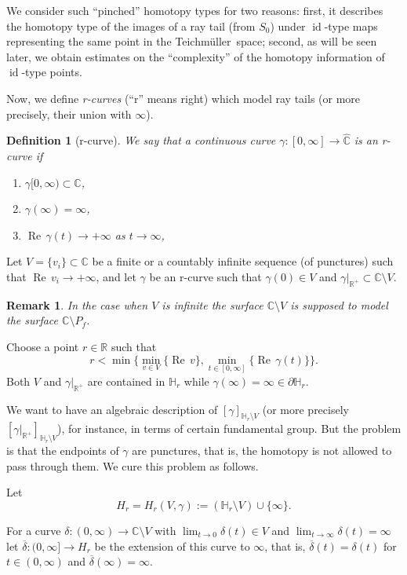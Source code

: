 \documentclass[10pt,reqno,a4paper]{amsart}
\numberwithin{figure}{section}
\numberwithin{equation}{section}
\newtheorem{defn}[thm]{Definition}
\newtheorem{remark}[thm]{Remark}
\newcommand{\tei}{Teichm\"uller}
\newcommand{\id}{\operatorname{id}}
\renewcommand{\Re}{\operatorname{Re\,}}
\begin{document}
We consider such ``pinched'' homotopy types for two reasons: first, it describes the homotopy type of the images of a ray tail (from $S_0$) under $\id$-type maps representing the same point in the \tei\ space; second, as will be seen later, we obtain estimates on the ``complexity'' of the homotopy information of $\id$-type points.

Now, we define \emph{r-curves} (``r'' means right) which model ray tails (or more precisely, their union with $\infty$).

\begin{defn}[r-curve]	
	We say that a continuous curve $\gamma:[0,\infty]\to\hat{\mathbb{C}}$ is an \emph{r-curve} if
	\begin{enumerate}
		\item $\gamma[0,\infty)\subset\mathbb{C}$,
		\item $\gamma(\infty)=\infty$,
		\item $\Re \gamma(t)\to+\infty$ as $t\to\infty$,
	\end{enumerate}
\end{defn}

Let $V=\{v_i\}\subset\mathbb{C}$ be a finite or a countably infinite sequence (of punctures) such that $\Re v_i\to +\infty$,  and  let $\gamma$ be an r-curve such that $\gamma(0)\in V$ and $\gamma|_{\mathbb{R}^+}\subset\mathbb{C}\setminus V$.

\begin{remark}
	In the case when $V$ is infinite the surface $\mathbb{C}\setminus V$ is supposed to model the surface $\mathbb{C}\setminus P_f$.
\end{remark}

Choose a point $r\in\mathbb{R}$ such that 
$$r < \min \{\min\limits_{v\in V}\{\Re v\},\min\limits_{t\in [0,\infty]}\{\Re \gamma(t)\}\}. $$ 
Both $V$ and $\gamma|_{\mathbb{R}^+}$ are contained in $\mathbb{H}_r$ while $\gamma(\infty)=\infty\in\partial\mathbb{H}_r$.

We want to have an algebraic description of $[\gamma]_{\mathbb{H}_r\setminus V}$ (or more precisely $[\gamma|_{\mathbb{R}^{+}}]_{\mathbb{H}_r\setminus V}$), for instance, in terms of certain fundamental group. But the problem is that the endpoints of $\gamma$ are punctures, that is, the homotopy is not allowed  to pass through them. We cure this problem as follows.

Let 
$$H_r=H_r(V,\gamma):=(\mathbb{H}_r\setminus V)\cup\{\infty\}.$$

For a curve $\delta:(0,\infty)\to\mathbb{C}\setminus V$ with $\lim_{t\to 0}\delta(t)\in V$ and $\lim_{t\to \infty}\delta(t)=\infty$ let $\overline{\delta}:(0,\infty]\to H_r$ be the extension of this curve to $\infty$, that is, $\overline{\delta}(t)=\delta(t)$ for $t\in(0,\infty)$ and $\overline{\delta}(\infty)=\infty$.
\end{document}
